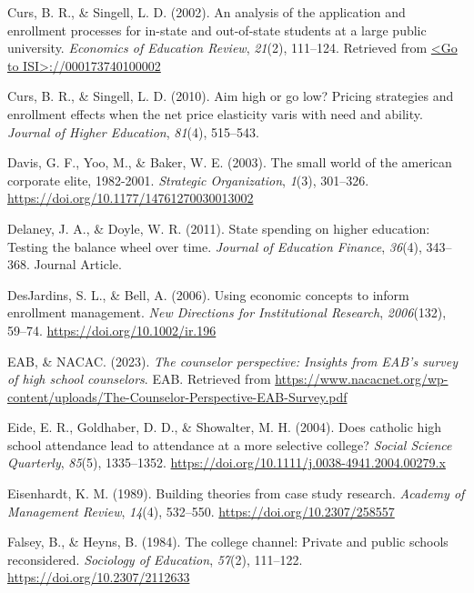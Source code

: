 \documentclass[
  12pt,
]{article}
\newlength{\cslhangindent}
\newenvironment{CSLReferences}[2] %
 {\begin{list}{}{%
  \setlength{\itemindent}{0pt}
  \setlength{\leftmargin}{0pt}
  \setlength{\parsep}{0pt}
  \ifodd #1
   \setlength{\leftmargin}{\cslhangindent}
   \setlength{\itemindent}{-1\cslhangindent}
  \fi
  \setlength{\itemsep}{#2\baselineskip}}}
 {\end{list}}
\begin{document}
\begin{CSLReferences}{1}{0}
Curs, B. R., \& Singell, L. D. (2002). An analysis of the application and enrollment processes for in-state and out-of-state students at a large public university. \emph{Economics of Education Review}, \emph{21}(2), 111--124. Retrieved from \href{\%3CGo\%20to\%20ISI\%3E://000173740100002}{\textless Go to ISI\textgreater://000173740100002}

Curs, B. R., \& Singell, L. D. (2010). Aim high or go low? Pricing strategies and enrollment effects when the net price elasticity varis with need and ability. \emph{Journal of Higher Education}, \emph{81}(4), 515--543.

Davis, G. F., Yoo, M., \& Baker, W. E. (2003). The small world of the american corporate elite, 1982-2001. \emph{Strategic Organization}, \emph{1}(3), 301--326. \url{https://doi.org/10.1177/14761270030013002}

Delaney, J. A., \& Doyle, W. R. (2011). State spending on higher education: Testing the balance wheel over time. \emph{Journal of Education Finance}, \emph{36}(4), 343--368. Journal Article.

DesJardins, S. L., \& Bell, A. (2006). Using economic concepts to inform enrollment management. \emph{New Directions for Institutional Research}, \emph{2006}(132), 59--74. \url{https://doi.org/10.1002/ir.196}

EAB, \& NACAC. (2023). \emph{The counselor perspective: Insights from EAB's survey of high school counselors}. EAB. Retrieved from \url{https://www.nacacnet.org/wp-content/uploads/The-Counselor-Perspective-EAB-Survey.pdf}

Eide, E. R., Goldhaber, D. D., \& Showalter, M. H. (2004). Does catholic high school attendance lead to attendance at a more selective college? \emph{Social Science Quarterly}, \emph{85}(5), 1335--1352. \url{https://doi.org/10.1111/j.0038-4941.2004.00279.x}

Eisenhardt, K. M. (1989). Building theories from case study research. \emph{Academy of Management Review}, \emph{14}(4), 532--550. \url{https://doi.org/10.2307/258557}

Falsey, B., \& Heyns, B. (1984). The college channel: Private and public schools reconsidered. \emph{Sociology of Education}, \emph{57}(2), 111--122. \url{https://doi.org/10.2307/2112633}


\end{CSLReferences}
\end{document}
